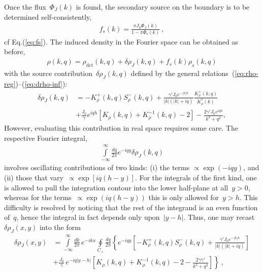 \documentclass[preprint,aps,eqsecnum, prb]{revtex4-1}
\newcommand{\fplus}[1]{{#1}^{+}}
\newcommand{\fminus}[1]{{#1}^{-}}
\newcommand{\dct}[1]{{#1}_\mathrm{dct}}
\begin{document}
Once the flux~$\Phi_J(k)$ is found, 
the secondary source on the boundary is to be determined self-consistently, 
\begin{align}
\label{eq:fs-J}
    f_{s}(k) = \frac{\pi J_0 \Phi_J(k)}{1 - \pi \Phi_s(k)}\ , 
\end{align} 
cf Eq.(\ref{eq:fs}). The induced density in the Fourier space can be 
obtained as before, 
\begin{align}
\rho(k, q) = \dct{\rho}(k, q) +  \delta\rho_J(k, q) + f_s(k) \rho_s(k, q)
\end{align}
with the source contribution~$\delta\rho_J(k, q)$ 
defined by the general relations~(\ref{eq:rho-reg})--(\ref{eq:drho-inf}):
\begin{align}
\delta\rho_{J}(k, q) &= - \fplus{K}_\rho(k, q) \fminus{S}_\rho(k, q)
+ \frac{\gamma' J_0 e^{-|k|h}}{|k|(|k| + iq)} 
  \frac{\fplus{K}_\rho(k, q)}{K_\rho^\ast(k)}  \\ \nonumber
&+ \frac{J_0}{\gamma} e^{iqh} 
\left[K_\rho(k, q) + K_\rho^{-1}(k, q) - 2\right] 
- \frac{2\gamma' J_0 e^{iqh}}{k^2 + q^2} , 
\end{align}
However, evaluating this contribution in real space requires some care.
The respective Fourier integral, 
\begin{align}
\int\limits_{-\infty}^{\infty}\frac{dq}{2\pi} e^{-iqy} \delta\rho_{J}(k, q) 
\end{align}
involves oscillating contributions of two kinds: (i) the terms
$\propto \exp(-iqy)$, and (ii) those that vary~$\propto \exp\left[i q (h - y)\right]$. 
For the integrals of the first kind, one is allowed to pull the integration
contour into the lower half-plane at all~$y > 0$, whereas for the 
terms~$\propto \exp(i q (h - y))$ this is only allowed for~$y > h$.
This difficulty is resolved by noticing that the rest of the integrand is 
an even function of~$q$, hence the integral in fact depends only 
upon~$|y - h|$. Thus, one may recast~$\delta\rho_J(x, y)$ into
the form
\begin{align}
\delta\rho_J(x, y) &= \int\limits_{-\infty}^{\infty}\frac{dk}{2\pi}\, e^{-ikx}
\oint\limits_{C_{+}} \frac{dq}{2\pi}
\left\{
e^{-iqy} \left[ - \fplus{K}_\rho(k, q) \fminus{S}_\rho(k, q)
+  \frac{\gamma' J_0 e^{-|k|h}}{|k|(|k| + iq)}\right] \right. \\ \nonumber
&+ \left. \frac{J_0}{\gamma}\, e^{-iq|y - h|} \left[
     K_\rho(k, q) + K_\rho^{-1}(k, q) - 2 
    - \frac{2\gamma \gamma'}{k^2 + q^2}
\right]
\right\}\ ,  
\end{align}
\end{document}

